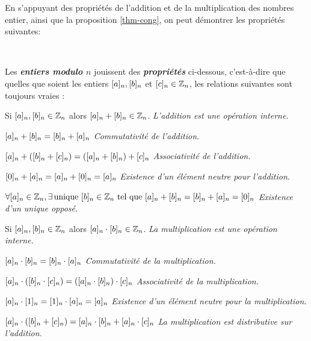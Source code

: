 \clearpage
En s'appuyant des propriétés de l'addition et de la multiplication des nombres entier, ainsi que la proposition \ref{thm-cong}, on peut démontrer les propriétés suivantes:
\begin{proposition}
	~
	
	Les \textbf{\textit{entiers modulo $n$}} jouissent des \textbf{\textit{propriétés}} ci-dessous, c'est-à-dire que quelles que soient les entiers $[a]_{n}, [b]_{n}$ et $[c]_{n} \in \mathbb{Z}_n$, les relations suivantes sont toujours vraies :
	
	\begin{description}[font=\normalfont\bfseries, leftmargin=1.2cm, style=nextline]
		\item[P1)] Si $[a]_{n}, [b]_{n} \in \mathbb{Z}_n$ alors $[a]_{n} + [b]_{n} \in \mathbb{Z}_n$. \hfill \textit{L'addition est une opération interne.}
		\item[P2)] $[a]_{n} + [b]_{n} = [b]_{n} + [a]_{n}$ \hfill \textit{Commutativité de l'addition.}
		\item[P3)] $[a]_{n} + ([b]_{n} + [c]_{n}) = ([a]_{n} + [b]_{n}) + [c]_{n}$ \hfill \textit{Associativité de l'addition.}
		\item[P4)] $[0]_{n} + [a]_{n} = [a]_{n} + [0]_{n} = [a]_{n}$ \hfill \textit{Existence d'un élément neutre pour l'addition.}
		\item[P5)] $\forall [a]_{n} \in \mathbb{Z}_n, \exists\,\text{unique } [b]_{n} \in \mathbb{Z}_n \text{ tel que } [a]_{n} + [b]_{n} = [b]_{n} + [a]_{n} = [0]_{n}$ \hfill \textit{Existence d'un unique opposé.}
		\item[P6)] Si $[a]_{n}, [b]_{n} \in \mathbb{Z}_n$ alors $[a]_{n} \cdot [b]_{n} \in \mathbb{Z}_n$. \hfill \textit{La multiplication est une opération interne.}
		\item[P7)] $[a]_{n} \cdot [b]_{n} = [b]_{n} \cdot [a]_{n}$ \hfill \textit{Commutativité de la multiplication.}
		\item[P8)] $[a]_{n} \cdot ([b]_{n} \cdot [c]_{n}) = ([a]_{n} \cdot [b]_{n}) \cdot [c]_{n}$ \hfill \textit{Associativité de la multiplication.}
		\item[P9)] $[a]_{n} \cdot [1]_{n} = [1]_{n} \cdot [a]_{n} = [a]_{n}$ \hfill \textit{Existence d'un élément neutre pour la multiplication.}
		\item[P10)] $[a]_{n} \cdot ([b]_{n} + [c]_{n}) = [a]_{n} \cdot [b]_{n} + [a]_{n} \cdot [c]_{n}$ \hfill \textit{La multiplication est distributive sur l'addition.}
	\end{description}
\end{proposition}

